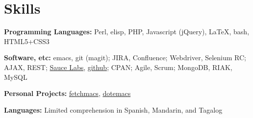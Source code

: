 \section{Skills}
%
\begin{position}
\item[] \textbf{Programming Languages:} Perl, elisp, PHP, Javascript (jQuery), \LaTeX, bash, HTML5+CSS3
\item[] \textbf{Software, etc:} emacs, git (magit); JIRA, Confluence; Webdriver, Selenium RC; AJAX, REST; \href{http://www.saucelabs.com}{Sauce Labs}, \href{http://www.github.com/gempesaw}{github}; CPAN; Agile, Scrum; MongoDB, RIAK, MySQL
\item[] \textbf{Personal Projects:} \href{http://github.com/gempesaw/fetchmacs}{fetchmacs}, \href{http://github.com/gempesaw/dotemacs}{dotemacs}
\item[] \textbf{Languages:} Limited comprehension in Spanish, Mandarin, and Tagalog
\end{position}
